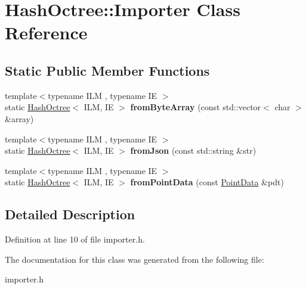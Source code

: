 \hypertarget{class_hash_octree_1_1_importer}{}\section{Hash\+Octree\+::Importer Class Reference}
\label{class_hash_octree_1_1_importer}
\subsection*{Static Public Member Functions}
\begin{DoxyCompactItemize}
\item 
\mbox{\label{class_hash_octree_1_1_importer_a61bfb4cd72a620992fbd3440237a0b11}} 
{\footnotesize template$<$typename I\+LM , typename IE $>$ }\\static \mbox{\hyperlink{class_hash_octree_1_1_hash_octree}{Hash\+Octree}}$<$ I\+LM, IE $>$ {\bfseries from\+Byte\+Array} (const std\+::vector$<$ char $>$ \&array)
\item 
\mbox{\label{class_hash_octree_1_1_importer_ab1779d953f69dda06dc13974eec0d1aa}} 
{\footnotesize template$<$typename I\+LM , typename IE $>$ }\\static \mbox{\hyperlink{class_hash_octree_1_1_hash_octree}{Hash\+Octree}}$<$ I\+LM, IE $>$ {\bfseries from\+Json} (const std\+::string \&str)
\item 
\mbox{\label{class_hash_octree_1_1_importer_ad56681c42016696b1b59001f5fce4098}} 
{\footnotesize template$<$typename I\+LM , typename IE $>$ }\\static \mbox{\hyperlink{class_hash_octree_1_1_hash_octree}{Hash\+Octree}}$<$ I\+LM, IE $>$ {\bfseries from\+Point\+Data} (const \mbox{\hyperlink{class_hash_octree_1_1_point_data}{Point\+Data}} \&pdt)
\end{DoxyCompactItemize}


\subsection{Detailed Description}


Definition at line 10 of file importer.\+h.



The documentation for this class was generated from the following file\+:\begin{DoxyCompactItemize}
\item 
importer.\+h\end{DoxyCompactItemize}
